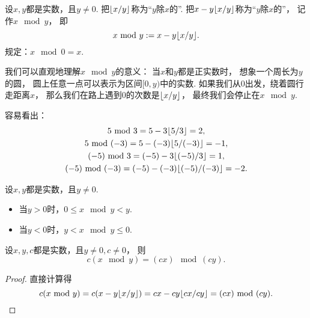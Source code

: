\begin{definition}
设\(x,y\)都是实数，且\(y\neq0\).
把\(\lfloor x/y\rfloor\)称为“\(y\)除\(x\)的”.
把\(x - y \lfloor x/y\rfloor\)称为“\(y\)除\(x\)的”，
记作\(x \mod y\)，
即\[
	x ~\mathrm{mod}~ y
	:=
	x - y \lfloor x/y\rfloor.
\]
规定：\(x \mod 0 = x\).
\end{definition}

我们可以直观地理解\(x \mod y\)的意义：
当\(x\)和\(y\)都是正实数时，
想象一个周长为\(y\)的圆，
圆上任意一点可以表示为区间\([0,y)\)中的实数.
如果我们从\(0\)出发，绕着圆行走距离\(x\)，
那么我们在路上遇到\(0\)的次数是\(\lfloor x/y\rfloor\)，
最终我们会停止在\(x \mod y\).

\begin{example}
容易看出：\begin{gather*}
	5~\mathrm{mod}~3
	= 5-3\lfloor5/3\rfloor
	= 2, \\
	5~\mathrm{mod}~(-3)
	= 5-(-3)\lfloor5/(-3)\rfloor
	= -1, \\
	(-5)~\mathrm{mod}~3
	= (-5)-3\lfloor(-5)/3\rfloor
	= 1, \\
	(-5)~\mathrm{mod}~(-3)
	= (-5)-(-3)\lfloor(-5)/(-3)\rfloor
	= -2.
\end{gather*}
\end{example}

\begin{property}
设\(x,y\)都是实数，且\(y\neq0\).
\begin{itemize}
	\item 当\(y>0\)时，\(0 \leq x \mod y < y\).
	\item 当\(y<0\)时，\(y < x \mod y \leq 0\).
\end{itemize}
\end{property}

\begin{property}
设\(x,y,c\)都是实数，且\(y\neq0,c\neq0\)，
则\begin{equation}
	c (x \mod y)
	= (c x) \mod (c y).
\end{equation}
\begin{proof}
直接计算得\begin{equation*}
	c (x ~\mathrm{mod}~ y)
	= c (x - y \lfloor x / y\rfloor)
	= c x - cy \lfloor cx / cy\rfloor
	= (c x) ~\mathrm{mod}~ (c y).
	\qedhere
\end{equation*}
\end{proof}
\end{property}

